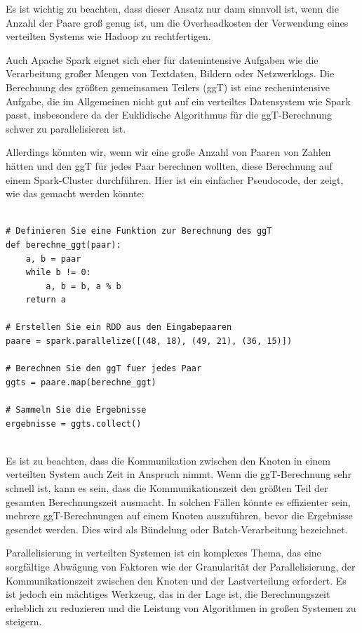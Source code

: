 Es ist wichtig zu beachten, dass dieser Ansatz nur dann sinnvoll ist, wenn die Anzahl der Paare groß genug ist, um die Overheadkosten der Verwendung eines verteilten Systems wie Hadoop zu rechtfertigen.

Auch Apache Spark eignet sich eher für datenintensive Aufgaben wie die Verarbeitung großer Mengen von Textdaten, Bildern oder Netzwerklogs. Die Berechnung des größten gemeinsamen Teilers (ggT) ist eine rechenintensive Aufgabe, die im Allgemeinen nicht gut auf ein verteiltes Datensystem wie Spark passt, insbesondere da der Euklidische Algorithmus für die ggT-Berechnung schwer zu parallelisieren ist.

Allerdings könnten wir, wenn wir eine große Anzahl von Paaren von Zahlen hätten und den ggT für jedes Paar berechnen wollten, diese Berechnung auf einem Spark-Cluster durchführen. Hier ist ein einfacher Pseudocode, der zeigt, wie das gemacht werden könnte:

\begin{lstlisting}[caption={RDD Spark},captionpos=b,label={lst:spark}]

# Definieren Sie eine Funktion zur Berechnung des ggT
def berechne_ggt(paar):
    a, b = paar
    while b != 0:
        a, b = b, a % b
    return a

# Erstellen Sie ein RDD aus den Eingabepaaren
paare = spark.parallelize([(48, 18), (49, 21), (36, 15)])

# Berechnen Sie den ggT fuer jedes Paar
ggts = paare.map(berechne_ggt)

# Sammeln Sie die Ergebnisse
ergebnisse = ggts.collect()


\end{lstlisting}

Es ist zu beachten, dass die Kommunikation zwischen den Knoten in einem verteilten System auch Zeit in Anspruch nimmt. Wenn die ggT-Berechnung sehr schnell ist, kann es sein, dass die Kommunikationszeit den größten Teil der gesamten Berechnungszeit ausmacht. In solchen Fällen könnte es effizienter sein, mehrere ggT-Berechnungen auf einem Knoten auszuführen, bevor die Ergebnisse gesendet werden. Dies wird als Bündelung oder Batch-Verarbeitung bezeichnet.

Parallelisierung in verteilten Systemen ist ein komplexes Thema, das eine sorgfältige Abwägung von Faktoren wie der Granularität der Parallelisierung, der Kommunikationszeit zwischen den Knoten und der Lastverteilung erfordert. Es ist jedoch ein mächtiges Werkzeug, das in der Lage ist, die Berechnungszeit erheblich zu reduzieren und die Leistung von Algorithmen in großen Systemen zu steigern.

